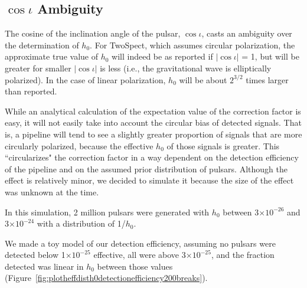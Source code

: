 \subsection{$\cos \iota$ Ambiguity}

The cosine of the inclination angle of the pulsar, $\cos \iota$, casts an ambiguity over the determination of $h_0$. 
For TwoSpect, which assumes circular polarization, the approximate true value of $h_0$ will indeed be as reported if $|\cos \iota|$ = 1, but will be greater for smaller $| \cos \iota |$ is less (i.e., the gravitational wave is elliptically polarized). 
In the case of linear polarization, $h_0$ will be about $2^{3/2}$ times larger than reported.

While an analytical calculation of the expectation value of the correction factor is easy, it will not easily take into account the circular bias of detected signals. That is, a pipeline will tend to see a slightly greater proportion of signals that are more circularly polarized, because the effective $h_0$ of those signals is greater. This ``circularizes" the correction factor in a way dependent on the detection efficiency of the pipeline and on the assumed prior distribution of pulsars. Although the effect is relatively minor, we decided to simulate it because the size of the effect was unknown at the time.

In this simulation, 2 million pulsars were generated with $h_0$ between 3$\times 10^{-26}$ and 3$\times 10^{-24}$ with a distribution of 1/$h_0$.

We made a toy model of our detection efficiency, assuming no pulsars were detected below 1$\times 10^{-25}$ effective, all were above 3$\times 10^{-25}$, and the fraction detected was linear in $h_0$ between those values (Figure~\ref{fig:plotheffdisth0detectionefficiency200breaks}).

